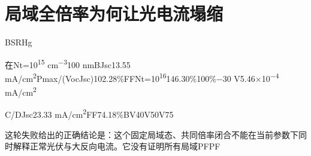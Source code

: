 \documentclass[11pt,a4paper]{article}
\begin{document}
\section{{\cjkfont 局域全倍率为何让光电流塌缩}\allowbreak{}}\label{sec:21}
B\allowbreak{}SRH\allowbreak{}g\allowbreak{}
\par
{\cjkfont 在}\allowbreak{}Nt=\allowbreak{}10\textsuperscript{15} cm\textsuperscript{−3}\allowbreak{}100 nm\allowbreak{}B\allowbreak{}Jsc\allowbreak{}13.55 mA/cm\textsuperscript{2}\allowbreak{}Pmax/(VocJsc)\allowbreak{}102.28\%\allowbreak{}FF\allowbreak{}Nt=\allowbreak{}10\textsuperscript{16}\allowbreak{}146.30\%\allowbreak{}100\%\allowbreak{}−30 V\allowbreak{}5.46\ensuremath{\times}10\textsuperscript{−4} mA/cm\textsuperscript{2}\allowbreak{}
\par
C/D\allowbreak{}Jsc\allowbreak{}23.33 mA/cm\textsuperscript{2}\allowbreak{}FF\allowbreak{}74.18\%\allowbreak{}B\allowbreak{}V40\allowbreak{}V50\allowbreak{}V75\allowbreak{}
\par
{\cjkfont 这轮失败给出的正确结论是：这个固定局域态、共同倍率闭合不能在当前参数下同时解释正常光伏与大反向电流。它没有证明所有局域}\allowbreak{}PF\allowbreak{}PF\allowbreak{}
\end{document}
